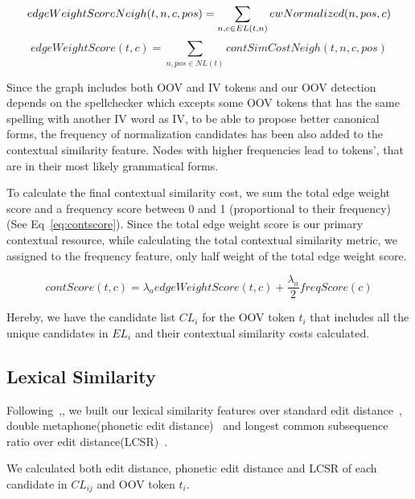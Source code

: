 \documentclass[preprint,review,12pt]{elsarticle}
\begin{document}
\begin{equation}
edgeWeightScoreNeigh(t,n,c,pos) = \sum_{n,c \in EL(t,n)}{ewNormalized(n,pos,c)} \\\\
\end{equation}
\begin{equation}
edgeWeightScore(t,c) = \sum_{n,pos \in NL(t) }{contSimCostNeigh(t,n,c,pos)}
\label{eq:wscore}
\end{equation}

Since the graph includes both OOV and IV tokens and our OOV detection depends on the spellchecker which excepts some OOV tokens that has the same spelling with another IV word as IV, to be able to propose better canonical forms, the frequency of normalization candidates has been also added to the contextual similarity feature. Nodes with higher frequencies lead to tokens', that are in their most likely grammatical forms.

To calculate the final contextual similarity cost, we sum the total edge weight score and a frequency score between 0 and 1 (proportional to their frequency) (See Eq~\ref{eq:contscore}). Since the total edge weight score is our primary contextual resource, while calculating the total contextual similarity metric, we assigned to the frequency feature, only half weight of the total edge weight score.

\begin{equation}
contScore(t,c) = \lambda_a edgeWeightScore(t,c) + \frac{\lambda_a} 2 freqScore(c)
\label{eq:contscore}
\end{equation}

Hereby, we have the candidate list $CL_{i}$ for the OOV token $t_i$ that includes all the unique candidates in $EL_{i}$ and their contextual similarity costs calculated.

\subsection{Lexical Similarity}

Following~\cite{Han:2011:LNS:2002472.2002520},\cite{DBLP:conf/acl/HassanM13}, we built our lexical similarity features over standard edit distance~\cite{levenshtein1966bcc}, double metaphone(phonetic edit distance)~\cite{Philips:2000:DMS:349124.349132} and longest common subsequence ratio over edit distance(LCSR)~\cite{Contractor:2010:UCN:1944566.1944588}.

We calculated both edit distance, phonetic edit distance and LCSR of each candidate in $CL_{ij}$ and OOV token $t_i$.
\end{document}
